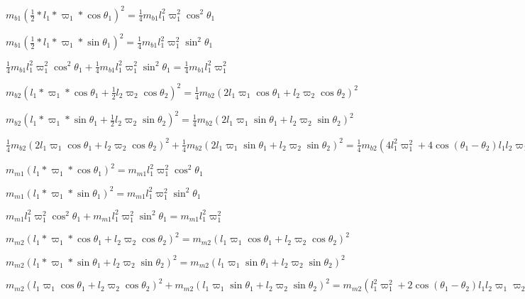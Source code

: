 \documentclass{article}
\begin{document}
$m_{b1}(\frac{1}{2} \ast l_{1} \ast \varpi _{1} \ast \cos \theta _{1})^{2} =\frac{1}{4}m_{b 1}l_{1}^{2}\varpi _{1}^{2}\cos ^{2} \theta _{1}$


$m_{b1}(\frac{1}{2} \ast l_{1} \ast \varpi _{1} \ast \sin \theta _{1})^{2} =\frac{1}{4}m_{b 1}l_{1}^{2}\varpi _{1}^{2}\sin ^{2} \theta _{1}$


$\frac{1}{4}m_{b 1}l_{1}^{2}\varpi _{1}^{2}\cos ^{2} \theta _{1} +\frac{1}{4}m_{b 1}l_{1}^{2}\varpi _{1}^{2}\sin ^{2} \theta _{1} =\frac{1}{4}m_{b 1}l_{1}^{2}\varpi _{1}^{2}$ 



$m_{b2}(l_{1} \ast \varpi _{1} \ast \cos \theta _{1} +\frac{1}{2}l_{2}\varpi _{2}\cos \theta _{2})^{2} =\frac{1}{4}m_{b 2}\left (2l_{1}\varpi _{1}\cos  \theta _{1} +l_{2}\varpi _{2}\cos  \theta _{2}\right )^{2}$


$m_{b2}(l_{1} \ast \varpi _{1} \ast \sin \theta _{1} +\frac{1}{2}l_{2}\varpi _{2}\sin \theta _{2})^{2} =\frac{1}{4}m_{b 2}\left (2l_{1}\varpi _{1}\sin  \theta _{1} +l_{2}\varpi _{2}\sin  \theta _{2}\right )^{2}$


$\frac{1}{4}m_{b 2}\left (2l_{1}\varpi _{1}\cos  \theta _{1} +l_{2}\varpi _{2}\cos  \theta _{2}\right )^{2} +\frac{1}{4}m_{b 2}\left (2l_{1}\varpi _{1}\sin  \theta _{1} +l_{2}\varpi _{2}\sin  \theta _{2}\right )^{2} =\frac{1}{4}m_{b 2}\left (4l_{1}^{2}\varpi _{1}^{2} +4\cos  \left (\theta _{1} -\theta _{2}\right )l_{1}l_{2}\varpi _{1}\varpi _{2} +l_{2}^{2}\varpi _{2}^{2}\right )$


$m_{m1}(l_{1} \ast \varpi _{1} \ast \cos \theta _{1})^{2} =m_{m 1}l_{1}^{2}\varpi _{1}^{2}\cos ^{2} \theta _{1}$


$m_{m1}(l_{1} \ast \varpi _{1} \ast \sin \theta _{1})^{2} =m_{m 1}l_{1}^{2}\varpi _{1}^{2}\sin ^{2} \theta _{1}$


$m_{m 1}l_{1}^{2}\varpi _{1}^{2}\cos ^{2} \theta _{1} +m_{m 1}l_{1}^{2}\varpi _{1}^{2}\sin ^{2} \theta _{1} =m_{m 1}l_{1}^{2}\varpi _{1}^{2}$


$m_{m2}(l_{1} \ast \varpi _{1} \ast \cos \theta _{1} +l_{2}\varpi _{2}\cos \theta _{2})^{2} =m_{m 2}\left (l_{1}\varpi _{1}\cos  \theta _{1} +l_{2}\varpi _{2}\cos  \theta _{2}\right )^{2}$


$m_{m2}(l_{1} \ast \varpi _{1} \ast \sin \theta _{1} +l_{2}\varpi _{2}\sin \theta _{2})^{2} =m_{m 2}\left (l_{1}\varpi _{1}\sin  \theta _{1} +l_{2}\varpi _{2}\sin  \theta _{2}\right )^{2}$


$m_{m 2}\left (l_{1}\varpi _{1}\cos  \theta _{1} +l_{2}\varpi _{2}\cos  \theta _{2}\right )^{2} +m_{m 2}\left (l_{1}\varpi _{1}\sin  \theta _{1} +l_{2}\varpi _{2}\sin  \theta _{2}\right )^{2} =m_{m 2}\left (l_{1}^{2}\varpi _{1}^{2} +2\cos  \left (\theta _{1} -\theta _{2}\right )l_{1}l_{2}\varpi _{1}\varpi _{2} +l_{2}^{2}\varpi _{2}^{2}\right )$
\end{document}
